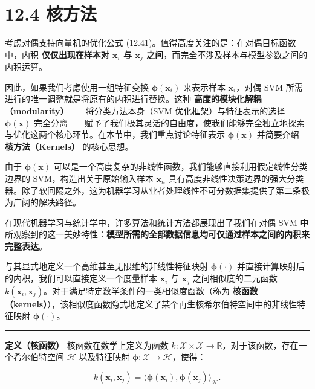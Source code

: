 \section*{12.4 核方法}
\label{sec:12.4}

考虑对偶支持向量机的优化公式 (12.41)。值得高度关注的是：在对偶目标函数中，内积 \textbf{仅仅出现在样本对 $ \boldsymbol{x}_i $ 与 $ \boldsymbol{x}_j $ 之间}，而完全不涉及样本与模型参数之间的内积运算。

因此，如果我们考虑使用一组特征变换 $ \boldsymbol{\phi}(\boldsymbol{x}_i) $ 来表示样本 $ \boldsymbol{x}_i $，对偶 SVM 所需进行的唯一调整就是将原有的内积进行替换。这种 \textbf{高度的模块化解耦（modularity）}——将分类方法本身（SVM 优化框架）与特征表示的选择 $ \boldsymbol{\phi}(\boldsymbol{x}) $ 完全分离——赋予了我们极其灵活的自由度，使我们能够完全独立地探索与优化这两个核心环节。在本节中，我们重点讨论特征表示 $ \boldsymbol{\phi}(\boldsymbol{x}) $ 并简要介绍 \textbf{核方法（Kernels）} 的核心思想。

由于 $ \boldsymbol{\phi}(\boldsymbol{x}) $ 可以是一个高度复杂的非线性函数，我们能够直接利用假定线性分类边界的 SVM，构造出关于原始输入样本 $ \boldsymbol{x}_n $ 具有高度非线性决策边界的强大分类器。除了软间隔之外，这为机器学习从业者处理线性不可分数据集提供了第二条极为广阔的解决路径。

在现代机器学习与统计学中，许多算法和统计方法都展现出了我们在对偶 SVM 中所观察到的这一美妙特性：\textbf{模型所需的全部数据信息均可仅通过样本之间的内积来完整表达}。

与其显式地定义一个高维甚至无限维的非线性特征映射 $ \boldsymbol{\phi}(\cdot) $ 并直接计算映射后的内积，我们可以直接定义一个度量样本 $ \boldsymbol{x}_i $ 与 $ \boldsymbol{x}_j $ 之间相似度的二元函数 $ k(\boldsymbol{x}_i, \boldsymbol{x}_j) $。对于满足特定数学条件的一类相似度函数（称为 \textbf{核函数（kernels）}），该相似度函数隐式地定义了某个再生核希尔伯特空间中的非线性特征映射 $ \boldsymbol{\phi}(\cdot) $。

\medskip\hrule\medskip

\textbf{定义（核函数）} 核函数在数学上定义为函数 $ k : \mathcal{X} \times \mathcal{X} \to \mathbb{R} $，对于该函数，存在一个希尔伯特空间 $ \mathcal{H} $ 以及特征映射 $ \boldsymbol{\phi} : \mathcal{X} \to \mathcal{H} $，使得：

\begin{equation}
k(\boldsymbol{x}_i, \boldsymbol{x}_j) = \langle \boldsymbol{\phi}(\boldsymbol{x}_i), \boldsymbol{\phi}(\boldsymbol{x}_j) \rangle_{\mathcal{H}} .
\tag{12.52}
\end{equation}

